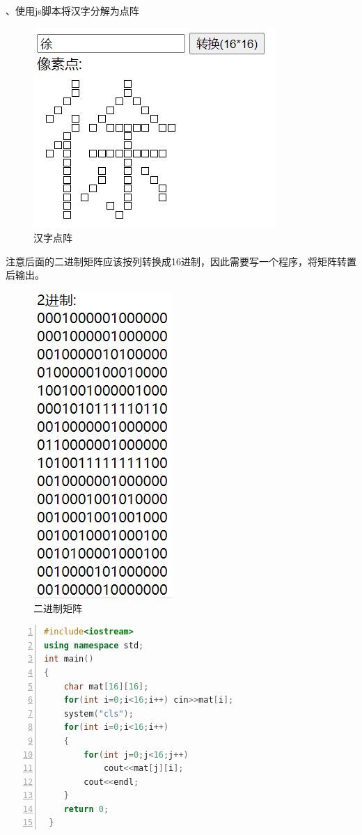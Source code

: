 \documentclass[UTF8]{ctexart}
\begin{document}
、使用js脚本将汉字分解为点阵
\begin{figure}[h!]
    \centering
    \includegraphics[scale=0.6]{name_mat.PNG}
    \caption{汉字点阵}
\end{figure}
\newline
注意后面的二进制矩阵应该按列转换成16进制，因此需要写一个程序，将矩阵转置后输出。
\begin{figure}[h!]
    \centering
    \includegraphics[scale=0.6]{name_mat_bin.PNG}
    \caption{二进制矩阵}
\end{figure}
\newline
\begin{lstlisting}[language={c++},numbers=left,numberstyle=\tiny,%frame=shadowbox,  
       rulesepcolor=\color{red!20!green!20!blue!20},  
       keywordstyle=\color{blue!70!black},  
       commentstyle=\color{blue!90!},  
       basicstyle=\ttfamily] 
#include<iostream>
using namespace std;
int main()
{
	char mat[16][16];
	for(int i=0;i<16;i++) cin>>mat[i];
	system("cls");
	for(int i=0;i<16;i++)
	{
		for(int j=0;j<16;j++)
			cout<<mat[j][i];
		cout<<endl;
	}
	return 0;
 } 
\end{lstlisting}
\end{document}

